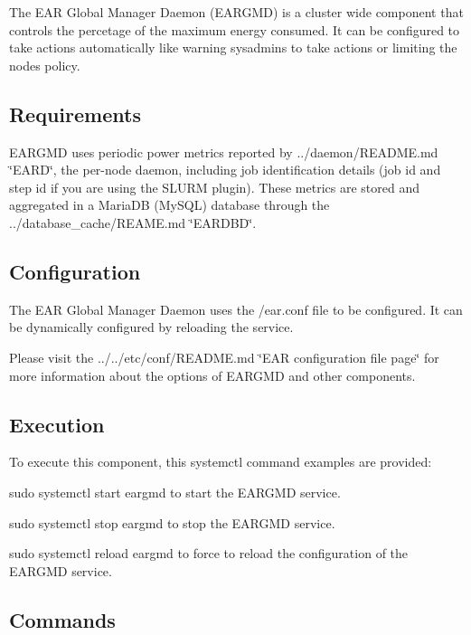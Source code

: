 The E\+AR Global Manager Daemon (E\+A\+R\+G\+MD) is a cluster wide component that controls the percetage of the maximum energy consumed. It can be configured to take actions automatically like warning sysadmins to take actions or limiting the nodes policy.

\subsection*{Requirements }

E\+A\+R\+G\+MD uses periodic power metrics reported by ../daemon/\+R\+E\+A\+D\+ME.md \char`\"{}\+E\+A\+R\+D\char`\"{}, the per-\/node daemon, including job identification details (job id and step id if you are using the S\+L\+U\+RM plugin). These metrics are stored and aggregated in a Maria\+DB (My\+S\+QL) database through the ../database\+\_\+cache/\+R\+E\+A\+ME.md \char`\"{}\+E\+A\+R\+D\+B\+D\char`\"{}.

\subsection*{Configuration }

The E\+AR Global Manager Daemon uses the {\ttfamily /ear.conf} file to be configured. It can be dynamically configured by reloading the service.

Please visit the ../../etc/conf/\+R\+E\+A\+D\+ME.md \char`\"{}\+E\+A\+R configuration file page\char`\"{} for more information about the options of E\+A\+R\+G\+MD and other components.

\subsection*{Execution }

To execute this component, this {\ttfamily systemctl} command examples are provided\+:
\begin{DoxyItemize}
\item {\ttfamily sudo systemctl start eargmd} to start the E\+A\+R\+G\+MD service.
\item {\ttfamily sudo systemctl stop eargmd} to stop the E\+A\+R\+G\+MD service.
\item {\ttfamily sudo systemctl reload eargmd} to force to reload the configuration of the E\+A\+R\+G\+MD service.
\end{DoxyItemize}

\subsection*{Commands }

